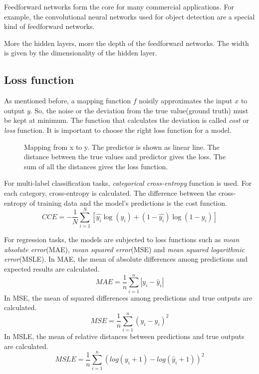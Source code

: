 Feedforward networks form the core for many commercial applications. For example, the
convolutional neural networks used for object detection are a special kind of feedforward
networks.

More the hidden layers, more the depth of the feedforward networks. The width is given by
the dimensionality of the hidden layer.

\subsection{Loss function}
\label{subsec:lossfunction}
As mentioned before, a mapping function $f$ noisily approximates the input $x$ to output
$y$. So, the noise or the deviation from the true value(ground truth) must be kept at
minimum. The function that calculates the deviation is called \textit{cost} or
\textit{loss} function. It is important to choose the right loss function for a model.

\begin{figure}[!h]
	\centering
    \def\svgwidth{0.6\textwidth}
    \caption{Mapping from x to y. The predictor is shown as linear line. The distance
    between the true values and predictor gives the loss. The sum of all the distances
gives the loss function.}
\label{fig:loss function}
\end{figure}

For multi-label classification tasks, \textit{categorical cross-entropy} function is used.
For each category, cross-entropy is calculated. The difference between the cross-entropy
of training data and the model's predictions is the cost function.
\begin{equation}
  CCE = -\frac{1}{N}\sum_{i = 1}^N [\hat{y_{i}}\log(y_{i})  + (1-
  \hat{y_{i}})\log(1-y_{i})]
   \label{eq:CCE}
\end{equation}

For regression tasks, the models are subjected to loss functions such as \textit{mean
absolute error}(MAE), \textit{mean squared error}(MSE) and \textit{mean squared
logarithmic error}(MSLE). In MAE, the mean of absolute differences among predictions and
expected results are calculated.
\begin{equation}
    MAE = \frac{1}{n}\sum_{i=1}^n\left |y_i -\hat y_i \right|
   \label{eq:MAE}
\end{equation}
In MSE, the mean of squared differences among predictions and true outputs are
calculated.
\begin{equation}
    MSE = \frac{1}{n}\sum_{i=1}^n (y_i - \hat y_i)^2
    \label{eq:MSE}
\end{equation}
In MSLE, the mean of relative distances between predictions and true outputs are
calculated.
\begin{equation}
    MSLE = \frac{1}{n}\sum_{i=1}^n(log(y_i+1)-log(\hat y_i+1))^2
    \label{eq:MSLE}
\end{equation}

